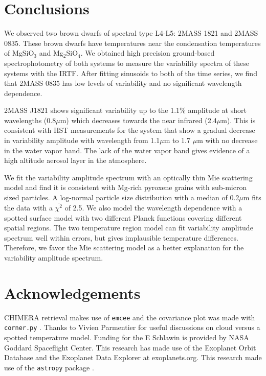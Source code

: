 \documentclass[twocolumn]{aastex6}
\begin{document}
\section{Conclusions}\label{sec:conclusions}

We observed two brown dwarfs of spectral type L4-L5: 2MASS 1821 and 2MASS 0835.
These brown dwarfs have temperatures near the condensation temperatures of MgSiO$_3$ and Mg$_2$SiO$_4$.
We obtained high precision ground-based spectrophotometry of both systems to measure the variability spectra of these systems with the IRTF.
After fitting sinusoids to both of the time series, we find that 2MASS 0835 has low levels of variability and no significant wavelength dependence.

2MASS J1821 shows significant variability up to the 1.1\% amplitude at short wavelengths (0.8$\mu$m) which decreases towards the near infrared (2.4$\mu$m).
This is consistent with HST measurements for the system that show a gradual decrease in variability amplitude with wavelength \citep{2016ApJ...826....8Y} from 1.1$\mu$m to 1.7 $\mu$m with no decrease in the water vapor band.
The lack of the water vapor band gives evidence of a high altitude aerosol layer in the atmosphere.

We fit the variability amplitude spectrum with an optically thin Mie scattering model and find it is consistent with Mg-rich pyroxene grains with sub-micron sized particles.
A log-normal particle size distribution with a median of 0.2$\mu$m fits the data with a $\bar{\chi^2}$ of 2.5.
We also model the wavelength dependence with a spotted surface model with two different Planck functions covering different spatial regions.
The two temperature region model can fit variability amplitude spectrum well within errors, but gives implausible temperature differences.
Therefore, we favor the Mie scattering model as a better explanation for the variability amplitude spectrum.

\section{Acknowledgements}
CHIMERA retrieval makes use of \texttt{emcee} \citep{foreman-mackey2013emcee} and the covariance plot was made with \texttt{corner.py} \citep{foremanCorner}.
Thanks to Vivien Parmentier for useful discussions on cloud versus a spotted temperature model.
Funding for the E Schlawin is provided by NASA Goddard Spaceflight Center.
This research has made use of the Exoplanet Orbit Database and the Exoplanet Data Explorer at exoplanets.org.
This research made use of the \texttt{astropy} package \citep{astropy2013}.
\end{document}
